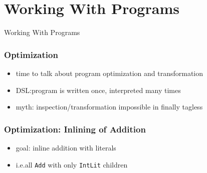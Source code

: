 \documentclass[aspectratio=169, hyperref={colorlinks, linkcolor=beamer@centricgreen}, urlcolor=links]{beamer}
\begin{document}
\section{Working With Programs}\label{sec:working-with-programs}

\begin{frame}
  \begin{center}
    \Huge
    Working With Programs
  \end{center}
\end{frame}

\begin{frame}
  \frametitle{Optimization}
  \begin{itemize}
  \item time to talk about program optimization and transformation
  \item DSL:\@ program is written once, interpreted many times
  \item myth: inspection/transformation impossible in finally tagless
  \end{itemize}
\end{frame}

\begin{frame}
  \frametitle{Optimization: Inlining of Addition}
  \begin{itemize}
  \item goal: inline addition with literals
  \item i.e.\@ all \texttt{Add} with only \texttt{IntLit} children
  \end{itemize}
\end{frame}
\end{document}
